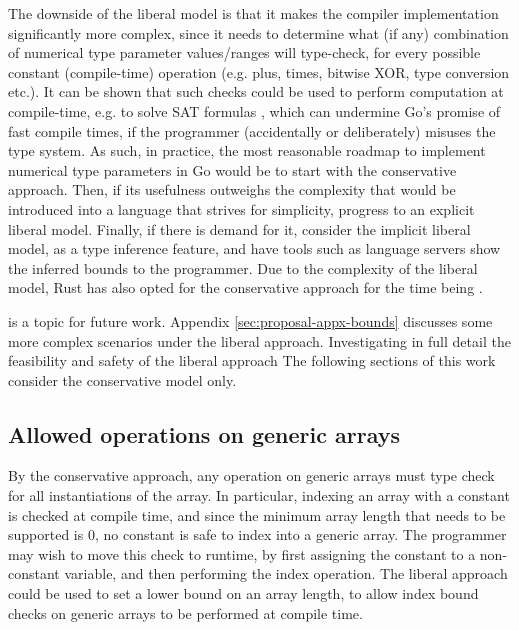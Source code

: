 The downside of the liberal model is that it makes the compiler implementation
significantly more complex, since it needs to determine what (if any)
combination of numerical type parameter values/ranges will type-check, for every
possible constant (compile-time) operation (e.g. plus, times, bitwise XOR, type
conversion etc.).
It can be shown that such checks could be used to perform computation at
compile-time, e.g. to solve SAT formulas \autocite{goArraySAT}, which can
undermine Go's promise of fast compile times, if the programmer (accidentally or
deliberately) misuses the type system. As such, in practice, the most reasonable
roadmap to implement numerical type parameters in Go would be to start with the
conservative approach. Then, if its usefulness outweighs the complexity that
would be introduced into a language that strives for simplicity, progress to an
explicit liberal model. Finally, if there is demand for it, consider the
implicit liberal model, as a type inference feature, and have tools such as
language servers show the inferred bounds to the programmer. Due to the
complexity of the liberal model, Rust has also opted for the conservative
approach for the time being \autocite{rustConstBlog}.

is a topic for future work. Appendix \ref{sec:proposal-appx-bounds} discusses
some more complex scenarios under the liberal approach. Investigating in full
detail the feasibility and safety of the liberal approach The following sections
of this work consider the conservative model only.

\subsection{Allowed operations on generic arrays}

By the conservative approach, any operation on generic arrays must type check
for all instantiations of the array. In particular, indexing an array with a
constant is checked at compile time, and since the minimum array length that
needs to be supported is 0, no constant is safe to index into a generic array.
The programmer may wish to move this check to runtime, by first assigning the
constant to a non-constant  variable, and then performing the index
operation. The liberal approach could be used to set a lower bound on an array
length, to allow index bound checks on generic arrays to be performed at
compile time.

